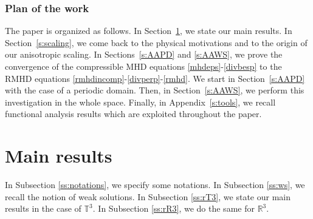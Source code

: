 \documentclass[11pt,reqno]{amsart}
\def \R{{\mathbb{R}}}
\def \T{{\mathbb{T}}}
\begin{document}
\subsubsection{Plan of the work}\label{sss:plan} The paper is organized as follows. In Section~\ref{s:results}, we  state our main results. In Section~\ref{s:scaling}, we  come back to the physical motivations and to the origin of  our anisotropic scaling. In Sections~\ref{s:AAPD} and \ref{s:AAWS}, we prove the convergence of the compressible MHD equations \eqref{mhdeps}-\eqref{divbesp} to the RMHD equations \eqref{rmhdincomp}-\eqref{divperp}-\eqref{rmhd}. We start in Section~\ref{s:AAPD} with the case of a periodic domain. Then, in Section~\ref{s:AAWS}, we perform this investigation in the whole space. Finally, in Appendix~\ref{s:tools}, we recall functional analysis results which are exploited throughout the paper.

\section{Main results}
\label{s:results}

In Subsection \ref{ss:notations}, we specify some notations. In Subsection \ref{ss:ws}, we
recall the notion of weak solutions. In Subsection \ref{ss:rT3}, we state our main results in the case of $ \T^3 $. In Subsection  \ref{ss:rR3}, we do the same for $ \R^3 $.

\end{document}
